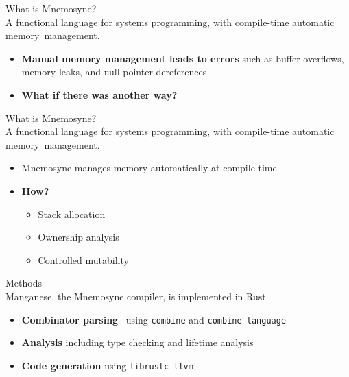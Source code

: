 \documentclass{beamer}
\begin{document}
\begin{frame}
\alert{\huge{What is Mnemosyne?}}\\
\large{A functional language for systems programming, \alert{with compile-time automatic memory~management}.}\normalsize
\begin{itemize}
    \item \textbf{Manual memory management leads to errors} such as buffer overflows, memory leaks, and null pointer dereferences~\cite{Shapiro:2006:PLC:1215995.1216004,hawblitzel2004low}
    \item \textbf{What if there was another way?}
\end{itemize}
\end{frame}

\begin{frame}
\alert{\huge{What is Mnemosyne?}}\\
\large{A functional language for systems programming, \alert{with compile-time automatic memory~management}.}\normalsize
\begin{itemize}
    \item Mnemosyne manages memory automatically at compile time
    \item \textbf{How?}
    \begin{itemize}
    \item<2-> Stack allocation~\cite{Hanson:1990:ESA:91556.91603,Corry:2006:OSA:1133956.1133978,Matsakis:2014:RL:2663171.2663188}
    \item<2-> Ownership analysis~\cite{Matsakis:2014:RL:2663171.2663188}
    \item<2-> Controlled mutability~\cite{Matsakis:2014:RL:2663171.2663188}
\end{itemize}
\end{itemize}
\end{frame}

\begin{frame}
\alert{\huge{Methods}}\\
\large{Manganese, the Mnemosyne compiler, is implemented in Rust}\normalsize
\begin{itemize}
    \item \textbf{Combinator parsing}~\cite{Danielsson:2010:TPC:1932681.1863585,frost2008parser,swierstra2001combinator,hutton1996monadic} using \texttt{combine} and \texttt{combine-language}
    \item \textbf{Analysis} including type checking and lifetime analysis~\cite{Matsakis:2014:RL:2663171.2663188,sobalvarro1988lifetime}
    \item \textbf{Code generation} using \texttt{librustc-llvm}~\cite{Lattner:2004:LCF:977395.977673}
\end{itemize}
\end{frame}
\end{document}
